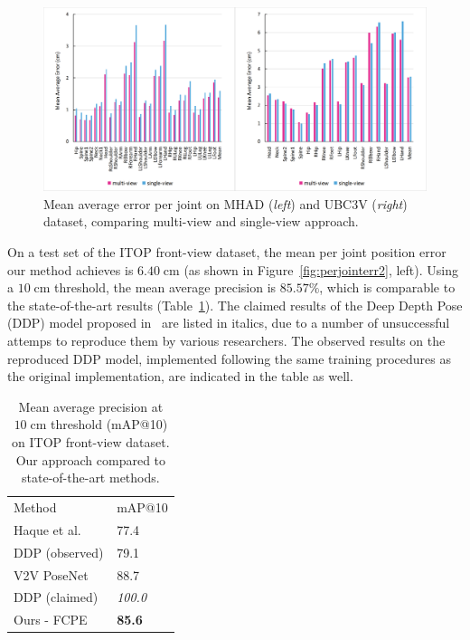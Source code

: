 \begin{figure}[H]
\begin{center}
\centering
\includegraphics[width=\textwidth]{images/results/perjointerr1.png}
\caption[Mean average error per joint on MHAD and UBC3V dataset.]{Mean average error per joint on MHAD ({\it left}) and UBC3V ({\it right}) dataset, comparing multi-view and single-view approach.}
\label{fig:perjointerr1}
\end{center}
\end{figure}

\noindent
On a test set of the ITOP front-view dataset, the mean per joint position error our method achieves is $6.40 \; \mbox{cm}$ (as shown in Figure~\ref{fig:perjointerr2}, left). Using a $10 \; \mbox{cm}$ threshold, the mean average precision is $85.57\%$, which is comparable to the state-of-the-art results (Table~\ref{table:ITOP_results}). The claimed results of the Deep Depth Pose (DDP) model proposed in~\cite{Marin18jvcir} are listed in italics, due to a number of unsuccessful attemps to reproduce them by various researchers. The observed results on the reproduced DDP model, implemented following the same training procedures as the original implementation, are indicated in the table as well.\par %
\vspace{5mm}
\setlength{\tabcolsep}{4pt}
\begin{table}[H]
\begin{center}
\caption[Mean average precision (mAP) on ITOP front-view dataset compared to state-of-the-art methods.]{Mean average precision at $10 \; \mbox{cm}$ threshold (mAP@10) on ITOP front-view dataset. Our approach compared to state-of-the-art methods.}
\label{table:ITOP_results}
\begin{tabular}{ll}
\hline\noalign{\smallskip}
Method & mAP@10 \\
\noalign{\smallskip}
\hline
\noalign{\smallskip}
Haque et al.~\cite{haque2016viewpoint} & 77.4\\
DDP (observed) &  79.1 \\ 
V2V PoseNet~\cite{DBLP:journals/corr/abs-1711-07399} &  88.7\\
DDP (claimed)~\cite{Marin18jvcir} & {\it 100.0}\\
\hline\noalign{\smallskip}
Ours - FCPE & {\bf 85.6} \\
\hline
\end{tabular}
\end{center}
\end{table}
\setlength{\tabcolsep}{1.4pt}


